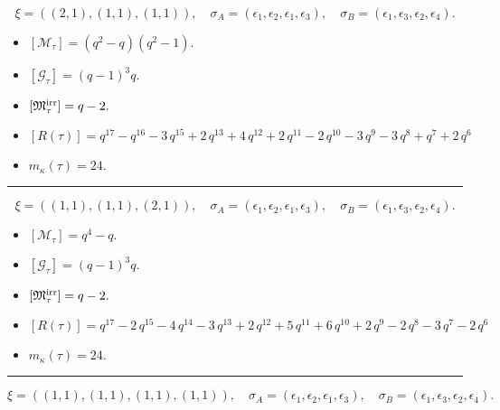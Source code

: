 \documentclass[10pt,a4paper]{amsart}
\begin{document}
$$\xi = ({(2, 1)}, {(1, 1), (1, 1)}),\quad \sigma_A = ({{\epsilon_1, \epsilon_2}}, {{\epsilon_1}, {\epsilon_3}}),\quad \sigma_B = ({{\epsilon_1, \epsilon_3}}, {{\epsilon_2}, {\epsilon_4}}).$$

\begin{itemize}
 \item $[\mathcal{M}_{\tau}] = {\left(q^{2} - q\right)} {\left(q^{2} - 1\right)} .$

 \item $[\mathcal{G}_{\tau}] = {\left(q - 1\right)}^{3} q .$

 \item $[{\frak M}_{\tau}^{\textrm{irr}}] = q - 2 .$

 \item $[R(\tau)] = q^{17} - q^{16} - 3 \, q^{15} + 2 \, q^{13} + 4 \, q^{12} + 2 \, q^{11} - 2 \, q^{10} - 3 \, q^{9} - 3 \, q^{8} + q^{7} + 2 \, q^{6} $

 \item $m_{\kappa}(\tau) = 24 .$

 \end{itemize}
\noindent\rule{8cm}{0.4pt}

$$\xi = ({(1, 1), (1, 1)}, {(2, 1)}),\quad \sigma_A = ({{\epsilon_1}, {\epsilon_2}}, {{\epsilon_1, \epsilon_3}}),\quad \sigma_B = ({{\epsilon_1}, {\epsilon_3}}, {{\epsilon_2, \epsilon_4}}).$$

\begin{itemize}
 \item $[\mathcal{M}_{\tau}] = q^{4} - q .$

 \item $[\mathcal{G}_{\tau}] = {\left(q - 1\right)}^{3} q .$

 \item $[{\frak M}_{\tau}^{\textrm{irr}}] = q - 2 .$

 \item $[R(\tau)] = q^{17} - 2 \, q^{15} - 4 \, q^{14} - 3 \, q^{13} + 2 \, q^{12} + 5 \, q^{11} + 6 \, q^{10} + 2 \, q^{9} - 2 \, q^{8} - 3 \, q^{7} - 2 \, q^{6} $

 \item $m_{\kappa}(\tau) = 24 .$

 \end{itemize}
\noindent\rule{8cm}{0.4pt}

$$\xi = ({(1, 1), (1, 1)}, {(1, 1), (1, 1)}),\quad \sigma_A = ({{\epsilon_1}, {\epsilon_2}}, {{\epsilon_1}, {\epsilon_3}}),\quad \sigma_B = ({{\epsilon_1}, {\epsilon_3}}, {{\epsilon_2}, {\epsilon_4}}).$$
\end{document}
